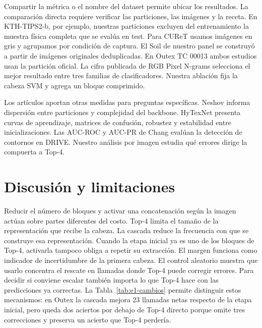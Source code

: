 \documentclass[a4paper,fleqn]{cas-sc}
\begin{document}
Compartir la métrica o el nombre del dataset permite ubicar los resultados. La comparación directa requiere verificar las particiones, las imágenes y la receta. En KTH-TIPS2-b, por ejemplo, nuestras particiones excluyen del entrenamiento la muestra física completa que se evalúa en test. Para CUReT usamos imágenes en gris y agrupamos por condición de captura. El Soil de nuestro panel se construyó a partir de imágenes originales deduplicadas. En Outex TC 00013 ambos estudios usan la partición oficial. La cifra publicada de RGB Pixel N-grams selecciona el mejor resultado entre tres familias de clasificadores. Nuestra ablación fija la cabeza SVM y agrega un bloque comprimido.

Los artículos aportan otras medidas para preguntas específicas. Neshov informa dispersión entre particiones y complejidad del backbone. HyTexNet presenta curvas de aprendizaje, matrices de confusión, robustez y estabilidad entre inicializaciones. Las AUC-ROC y AUC-PR de Chang evalúan la detección de contornos en DRIVE. Nuestro análisis por imagen estudia qué errores dirige la compuerta a Top-4.

\FloatBarrier
\section{Discusión y limitaciones}

Reducir el número de bloques y activar una concatenación según la imagen actúan sobre partes diferentes del costo. Top-4 limita el tamaño de la representación que recibe la cabeza. La cascada reduce la frecuencia con que se construye esa representación. Cuando la etapa inicial ya es uno de los bloques de Top-4, activarla tampoco obliga a repetir su extracción. El margen funciona como indicador de incertidumbre de la primera cabeza. El control aleatorio muestra que usarlo concentra el rescate en llamadas donde Top-4 puede corregir errores. Para decidir si conviene escalar también importa lo que Top-4 hace con las predicciones ya correctas. La Tabla~\ref{tab:e1-cambios} permite distinguir estos mecanismos: en Outex la cascada mejora 23 llamadas netas respecto de la etapa inicial, pero queda dos aciertos por debajo de Top-4 directo porque omite tres correcciones y preserva un acierto que Top-4 perdería.
\end{document}
